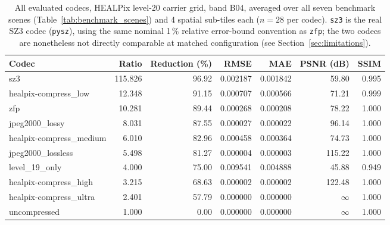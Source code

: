 \begin{table}[t]
\centering
\caption{All evaluated codecs, HEALPix level-20 carrier grid, band B04, averaged over all seven benchmark scenes (Table~\ref{tab:benchmark_scenes}) and 4 spatial sub-tiles each ($n=28$ per codec). \texttt{sz3} is the real SZ3 codec (\texttt{pysz}), using the same nominal 1\,\% relative error-bound convention as \texttt{zfp}; the two codecs are nonetheless not directly comparable at matched configuration (see Section~\ref{sec:limitations}).}
\label{tab:benchmarks_all_scenes}
\begin{tabular}{@{}lrrrrrr@{}}
\toprule
Codec & Ratio & Reduction (\%) & RMSE & MAE & PSNR (dB) & SSIM \\
\midrule
sz3                      & 115.826 & 96.92 & 0.002187 & 0.001842 & 59.80     & 0.995 \\
healpix-compress\_low    & 12.348  & 91.15 & 0.000707 & 0.000566 & 71.21     & 0.999 \\
zfp                      & 10.281  & 89.44 & 0.000268 & 0.000208 & 78.22     & 1.000 \\
jpeg2000\_lossy          & 8.031   & 87.55 & 0.000027 & 0.000022 & 96.14     & 1.000 \\
healpix-compress\_medium & 6.010   & 82.96 & 0.000458 & 0.000364 & 74.73     & 1.000 \\
jpeg2000\_lossless       & 5.498   & 81.27 & 0.000004 & 0.000003 & 115.22    & 1.000 \\
level\_19\_only          & 4.000   & 75.00 & 0.009541 & 0.004888 & 45.88     & 0.949 \\
healpix-compress\_high   & 3.215   & 68.63 & 0.000002 & 0.000002 & 122.48    & 1.000 \\
healpix-compress\_ultra  & 2.401   & 57.79 & 0.000000 & 0.000000 & $\infty$  & 1.000 \\
uncompressed             & 1.000   & 0.00  & 0.000000 & 0.000000 & $\infty$  & 1.000 \\
\bottomrule
\end{tabular}
\end{table}

